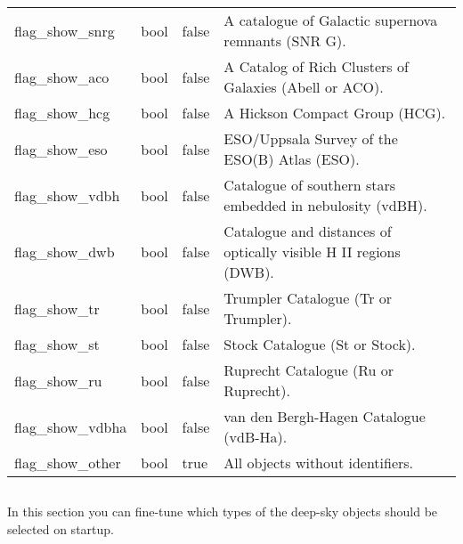 \begin{longtable}{l|l|l|p{90mm}}
flag\_show\_snrg  & bool & false & A catalogue of Galactic supernova remnants (SNR G). \\%
flag\_show\_aco   & bool & false & A Catalog of Rich Clusters of Galaxies (Abell or ACO). \\%
flag\_show\_hcg   & bool & false & A Hickson Compact Group (HCG). \\%
flag\_show\_eso   & bool & false & ESO/Uppsala Survey of the ESO(B) Atlas (ESO). \\%
flag\_show\_vdbh  & bool & false & Catalogue of southern stars embedded in nebulosity (vdBH). \\%
flag\_show\_dwb   & bool & false & Catalogue and distances of optically visible H II regions (DWB). \\%
flag\_show\_tr    & bool & false & Trumpler Catalogue (Tr or Trumpler). \\%
flag\_show\_st    & bool & false & Stock Catalogue (St or Stock). \\%
flag\_show\_ru    & bool & false & Ruprecht Catalogue (Ru or Ruprecht). \\%
flag\_show\_vdbha & bool & false & van den Bergh-Hagen Catalogue (vdB-Ha). \\%
flag\_show\_other & bool & true & All objects without identifiers. \\\bottomrule
\end{longtable}

\subsection{}
In this section you can fine-tune which types of the deep-sky objects should be selected on startup.

